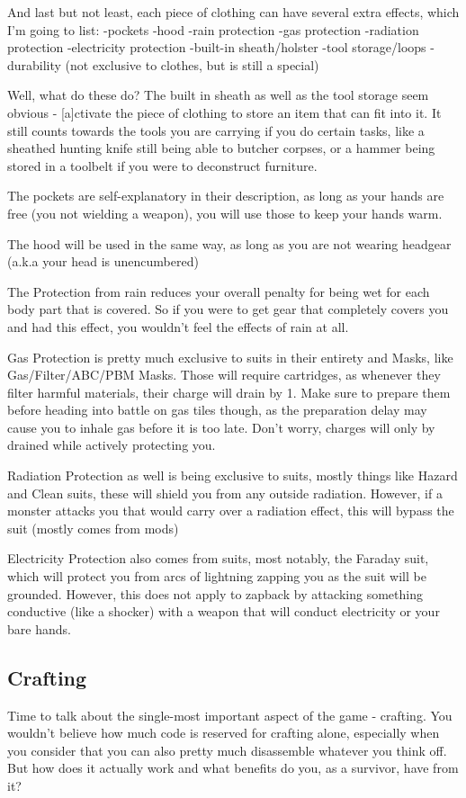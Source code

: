 \documentclass[11pt]{report}
\begin{document}
And last but not least, each piece of clothing can have several extra effects, which I'm going to list:
-pockets
-hood
-rain protection
-gas protection
-radiation protection
-electricity protection
-built-in sheath/holster
-tool storage/loops
-durability (not exclusive to clothes, but is still a special)

Well, what do these do?
The built in sheath as well as the tool storage seem obvious - [a]ctivate the piece of clothing to store an item that can fit into it. It still counts towards the tools you are carrying if you do certain tasks, like a sheathed hunting knife still being able to butcher corpses, or a hammer being stored in a toolbelt if you were to deconstruct furniture.

The pockets are self-explanatory in their description, as long as your hands are free (you not wielding a weapon), you will use those to keep your hands warm.

The hood will be used in the same way, as long as you are not wearing headgear (a.k.a your head is unencumbered)

The Protection from rain reduces your overall penalty for being wet for each body part that is covered. So if you were to get gear that completely covers you and had this effect, you wouldn't feel the effects of rain at all.

Gas Protection is pretty much exclusive to suits in their entirety and Masks, like Gas/Filter/ABC/PBM Masks. Those will require cartridges, as whenever they filter harmful materials, their charge will drain by 1. Make sure to prepare them before heading into battle on gas tiles though, as the preparation delay may cause you to inhale gas before it is too late. Don't worry, charges will only by drained while actively protecting you.

Radiation Protection as well is being exclusive to suits, mostly things like Hazard and Clean suits, these will shield you from any outside radiation. However, if a monster attacks you that would carry over a radiation effect, this will bypass the suit (mostly comes from mods)

Electricity Protection also comes from suits, most notably, the Faraday suit, which will protect you from arcs of lightning zapping you as the suit will be grounded. However, this does not apply to zapback by attacking something conductive (like a shocker) with a weapon that will conduct electricity or your bare hands.

\subsection{Crafting}
Time to talk about the single-most important aspect of the game - crafting.
You wouldn't believe how much code is reserved for crafting alone, especially when you consider that you can also pretty much disassemble whatever you think off. But how does it actually work and what benefits do you, as a survivor, have from it?
\end{document}
